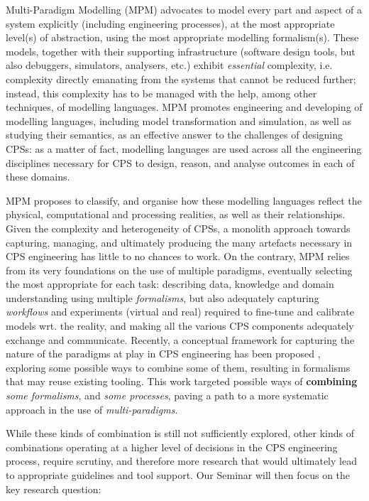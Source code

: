 Multi-Paradigm Modelling (MPM) advocates to model every part and aspect of a system
explicitly (including engineering processes), at the most appropriate level(s) 
of abstraction, using the most appropriate modelling formalism(s). These models,
together with their supporting infrastructure (software design tools, but also
debuggers, simulators, analysers, etc.) exhibit \emph{essential} complexity, i.e.
complexity directly emanating from the systems that cannot be reduced further;
instead, this complexity has to be managed with the help, among other techniques,
of modelling languages. MPM promotes engineering and developing of 
modelling languages, including model transformation and simulation, as well as
studying their semantics, as an effective answer to the challenges of designing
CPSs: as a matter of fact, modelling languages are used across all the engineering
disciplines necessary for CPS to design, reason, and analyse outcomes in each
of these domains.

MPM proposes to classify, and organise how these modelling languages reflect 
the physical, computational and processing realities, as well as their relationships.
Given the complexity and heterogeneity of CPSs, a monolith approach towards
capturing, managing, and ultimately producing the many artefacts necessary in
CPS engineering has little to no chances to work. On the contrary, MPM relies 
from its very foundations on the use of multiple paradigms, eventually selecting
the most appropriate for each task: describing data, knowledge and domain understanding 
using multiple \emph{formalisms}, but also adequately capturing \emph{workflows} 
and experiments (virtual and real) required to fine-tune and calibrate models 
wrt. the reality, and making all the various CPS components adequately exchange 
and communicate.
Recently, a conceptual framework for capturing the nature of the paradigms at 
play in CPS engineering has been proposed \cite{J:Amrani-etAl:2020}, exploring some 
possible ways to combine some of them, resulting in formalisms that may reuse
existing tooling. This work targeted possible ways of \textbf{combining} 
\emph{some formalisms}, and \emph{some processes}, paving a path to a more systematic
approach in the use of \emph{multi-paradigms}.

While these kinds of combination is still not sufficiently explored, other kinds
of combinations operating at a higher level of decisions in the CPS engineering
process, require scrutiny, and therefore more research that would ultimately
lead to appropriate guidelines and tool support. Our Seminar will then focus on
the key research question:

